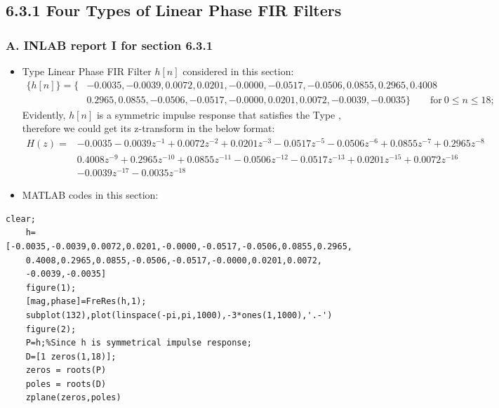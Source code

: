 \documentclass[onecolumn,oneside]{SUSTechHomework}
\begin{document}
\subsection*{6.3.1 Four Types of Linear Phase FIR Filters}
\subsubsection*{A. INLAB report I for section 6.3.1}
\begin{itemize}
    \item Type \MakeUppercase{} Linear Phase FIR Filter $h[n]$ considered in this section:
    $$
    \begin{aligned}
        \{h[n]\} = \{&-0.0035,-0.0039,0.0072,0.0201,-0.0000,-0.0517,-0.0506,0.0855,0.2965,0.4008 
        \\ & 0.2965,0.0855,-0.0506,-0.0517,-0.0000,0.0201,0.0072,-0.0039,-0.0035\}
         \qquad \text{for}\ 0\leq n \leq 18;  
    \end{aligned}
    $$
    Evidently, $h[n]$ is a symmetric impulse response that satisfies the Type \MakeUppercase{}, therefore we could get its z-transform in the below format:\\
    $$
    \begin{aligned}
        H(z)=&-0.0035-0.0039z^{-1}+0.0072z^{-2}+0.0201z^{-3}-0.0517z^{-5}-0.0506z^{-6}+0.0855z^{-7}+0.2965z^{-8}\\
             &0.4008z^{-9}+0.2965z^{-10}+0.0855z^{-11} - 0.0506z^{-12}-0.0517z^{-13}+0.0201z^{-15}+0.0072z^{-16}\\ 
             &-0.0039z^{-17} -0.0035z^{-18}
    \end{aligned}
    $$
    \item MATLAB codes in this section:
\end{itemize}
\begin{lstlisting}[title=\textbf{q6\_3\_1a.m}]
    clear;
    h=[-0.0035,-0.0039,0.0072,0.0201,-0.0000,-0.0517,-0.0506,0.0855,0.2965,
    0.4008,0.2965,0.0855,-0.0506,-0.0517,-0.0000,0.0201,0.0072,
    -0.0039,-0.0035]
    figure(1);
    [mag,phase]=FreRes(h,1);
    subplot(132),plot(linspace(-pi,pi,1000),-3*ones(1,1000),'.-')
    figure(2);
    P=h;%Since h is symmetrical impulse response;
    D=[1 zeros(1,18)];
    zeros = roots(P) 
    poles = roots(D)
    zplane(zeros,poles)
\end{lstlisting}
\end{document}
